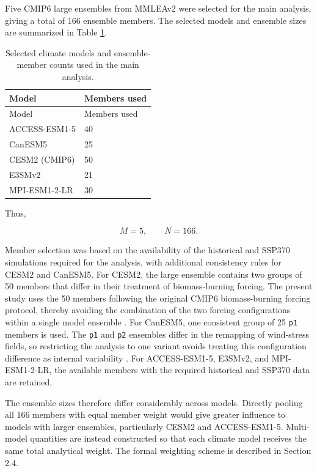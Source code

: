\documentclass[
]{krantz}
\begin{document}
Five CMIP6 large ensembles from MMLEAv2 were selected for the main analysis, giving a total of 166 ensemble members. The selected models and ensemble sizes are summarized in Table \ref{tab:unc-model-members}.

\begin{longtable}[]{@{}ll@{}}
\caption{\label{tab:unc-model-members} Selected climate models and ensemble-member counts used in the main analysis.}\tabularnewline
\toprule\noalign{}
Model & Members used \\
\midrule\noalign{}
\endfirsthead
\toprule\noalign{}
Model & Members used \\
\midrule\noalign{}
\endhead
\bottomrule\noalign{}
\endlastfoot
ACCESS-ESM1-5 & 40 \\
CanESM5 & 25 \\
CESM2 (CMIP6) & 50 \\
E3SMv2 & 21 \\
MPI-ESM1-2-LR & 30 \\
\end{longtable}

Thus,

\[
M=5,
\qquad
N=166.
\]

Member selection was based on the availability of the historical and SSP370 simulations required for the analysis, with additional consistency rules for CESM2 and CanESM5. For CESM2, the large ensemble contains two groups of 50 members that differ in their treatment of biomass-burning forcing. The present study uses the 50 members following the original CMIP6 biomass-burning forcing protocol, thereby avoiding the combination of the two forcing configurations within a single model ensemble \citep{Rodgers2021}. For CanESM5, one consistent group of 25 \texttt{p1} members is used. The \texttt{p1} and \texttt{p2} ensembles differ in the remapping of wind-stress fields, so restricting the analysis to one variant avoids treating this configuration difference as internal variability \citep{Swart2019}. For ACCESS-ESM1-5, E3SMv2, and MPI-ESM1-2-LR, the available members with the required historical and SSP370 data are retained.

The ensemble sizes therefore differ considerably across models. Directly pooling all 166 members with equal member weight would give greater influence to models with larger ensembles, particularly CESM2 and ACCESS-ESM1-5. Multi-model quantities are instead constructed so that each climate model receives the same total analytical weight. The formal weighting scheme is described in Section 2.4.
\end{document}
